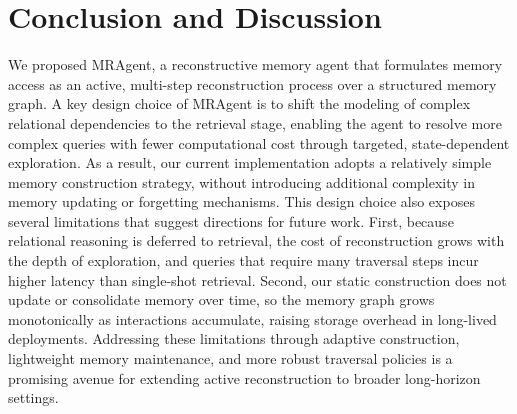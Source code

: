 \documentclass{llmxive}
\begin{document}



\section{Conclusion and Discussion}
We proposed MRAgent, a reconstructive memory agent that formulates memory access as an active, multi-step reconstruction process over a structured memory graph.
A key design choice of MRAgent is to shift the modeling of complex relational dependencies to the retrieval stage, enabling the agent to resolve more complex queries with fewer computational cost through targeted, state-dependent exploration.
As a result, our current implementation adopts a relatively simple memory construction strategy, without introducing additional complexity in memory updating or forgetting mechanisms.
This design choice also exposes several limitations that suggest directions for
future work. First, because relational reasoning is deferred to retrieval, the
cost of reconstruction grows with the depth of exploration, and queries that require many traversal steps incur higher latency than single-shot retrieval.
Second, our static construction does not update or consolidate memory over time, so the memory graph grows monotonically as interactions accumulate, raising storage overhead in long-lived deployments.  Addressing these limitations
through adaptive construction, lightweight memory maintenance, and more robust traversal policies is a promising avenue for extending active reconstruction to
broader long-horizon settings.
\end{document}

